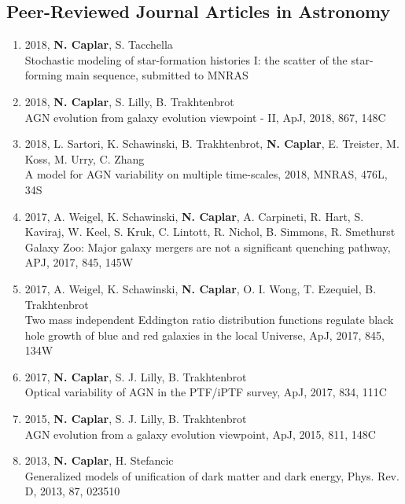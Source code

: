 \documentclass[11pt,letterpaper]{article}
\begin{document}

\subsection*{Peer-Reviewed Journal Articles in Astronomy}

\begin{enumerate}

\item 2018, \textbf{N. Caplar}, S. Tacchella \\
Stochastic modeling of star-formation histories I: the scatter of the star-forming main sequence, submitted to MNRAS

\item 2018, \textbf{N. Caplar}, S. Lilly, B. Trakhtenbrot\\
AGN evolution from galaxy evolution viewpoint - II, ApJ, 2018, 867, 148C

\item 2018, L. Sartori, K. Schawinski, B. Trakhtenbrot, \textbf{N. Caplar}, E. Treister, M. Koss, M. Urry, C. Zhang \\
A model for AGN variability on multiple time-scales, 2018, MNRAS, 476L, 34S

\item 2017, A. Weigel, K. Schawinski,  \textbf{N. Caplar}, A. Carpineti, R. Hart, S. Kaviraj, W. Keel, S. Kruk, C. Lintott, R. Nichol, B. Simmons, R. Smethurst
\\    Galaxy Zoo:  Major galaxy mergers are not a significant quenching pathway, APJ, 2017, 845, 145W \\

\item 2017, A. Weigel, K. Schawinski,  \textbf{N. Caplar}, O. I. Wong, T. Ezequiel, B. Trakhtenbrot
\\    Two mass independent Eddington ratio distribution functions regulate black hole growth of blue and red 
galaxies in the local Universe, ApJ, 2017, 845, 134W \\

\item 2017,  \textbf{N. Caplar}, S. J. Lilly, B. Trakhtenbrot   \\Optical variability of AGN in the PTF/iPTF survey, ApJ, 2017, 834, 111C   \\
 
\item 2015,  \textbf{N. Caplar}, S. J. Lilly, B. Trakhtenbrot  \\AGN evolution from a galaxy evolution viewpoint, ApJ,  2015, 811, 148C \\
  
 \item 2013,  \textbf{N. Caplar}, H. Stefancic  \\ Generalized models of unification of dark matter and dark energy, Phys. Rev. D, 2013, 87, 023510 
\end{enumerate}
\end{document}
